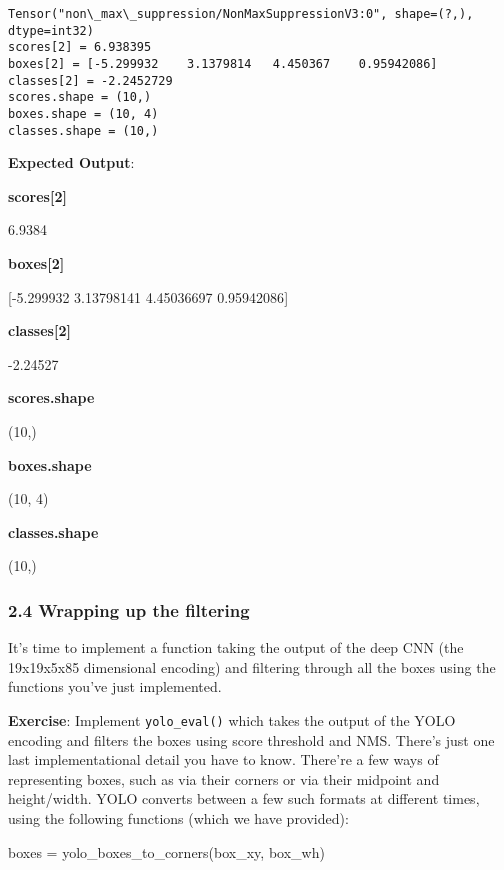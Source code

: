 \documentclass[11pt]{article}
\newenvironment{Shaded}{}{}
\newcommand{\NormalTok}[1]{{#1}}
\newcommand{\OperatorTok}[1]{\textcolor[rgb]{0.40,0.40,0.40}{{#1}}}
\begin{document}
    \begin{Verbatim}[commandchars=\\\{\}]
Tensor("non\_max\_suppression/NonMaxSuppressionV3:0", shape=(?,), dtype=int32)
scores[2] = 6.938395
boxes[2] = [-5.299932    3.1379814   4.450367    0.95942086]
classes[2] = -2.2452729
scores.shape = (10,)
boxes.shape = (10, 4)
classes.shape = (10,)

    \end{Verbatim}

    \textbf{Expected Output}:

\textbf{scores{[}2{]}}

6.9384

\textbf{boxes{[}2{]}}

{[}-5.299932 3.13798141 4.45036697 0.95942086{]}

\textbf{classes{[}2{]}}

-2.24527

\textbf{scores.shape}

(10,)

\textbf{boxes.shape}

(10, 4)

\textbf{classes.shape}

(10,)

    \hypertarget{wrapping-up-the-filtering}{%
\subsubsection{2.4 Wrapping up the
filtering}\label{wrapping-up-the-filtering}}

It's time to implement a function taking the output of the deep CNN (the
19x19x5x85 dimensional encoding) and filtering through all the boxes
using the functions you've just implemented.

\textbf{Exercise}: Implement \texttt{yolo\_eval()} which takes the
output of the YOLO encoding and filters the boxes using score threshold
and NMS. There's just one last implementational detail you have to know.
There're a few ways of representing boxes, such as via their corners or
via their midpoint and height/width. YOLO converts between a few such
formats at different times, using the following functions (which we have
provided):

\begin{Shaded}
\begin{Highlighting}[]
\NormalTok{boxes }\OperatorTok{=}\NormalTok{ yolo_boxes_to_corners(box_xy, box_wh) }
\end{Highlighting}
\end{Shaded}
\end{document}
